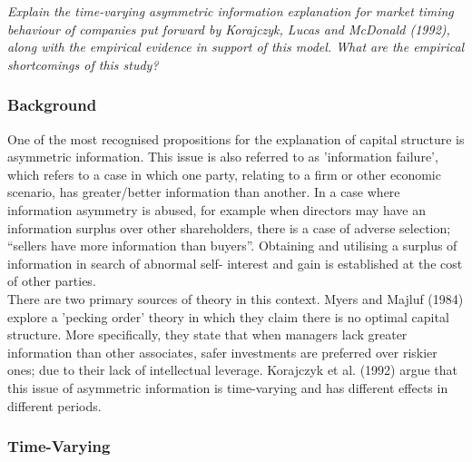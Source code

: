\documentclass[11pt, english]{article}
\begin{document}
	\textit{Explain the time-varying asymmetric information explanation for market timing behaviour of companies put forward by Korajczyk, Lucas and McDonald (1992), along with the empirical evidence in support of this model. What are the empirical shortcomings of this study?}

		\subsubsection*{Background}

	One of the most recognised propositions for the explanation of capital structure is asymmetric information. This issue is also referred to as 'information failure', which refers to a case in which one party, relating to a firm or other economic scenario, has greater/better information than another. In a case where information asymmetry is abused, for example when directors may have an information surplus over other shareholders, there is a case of adverse selection; ``sellers have more information than buyers''. Obtaining and utilising a surplus of information in search of abnormal self- interest and gain is established at the cost of other parties.\\

	There are two primary sources of theory in this context. Myers and Majluf (1984) explore a 'pecking order' theory in which they claim there is no optimal capital structure. More specifically, they state that when managers lack greater information than other associates, safer investments are preferred over riskier ones; due to their lack of intellectual leverage. Korajczyk et al. (1992) argue that this issue of asymmetric information is time-varying and has different effects in different periods.

		\subsubsection*{Time-Varying}
\end{document}
